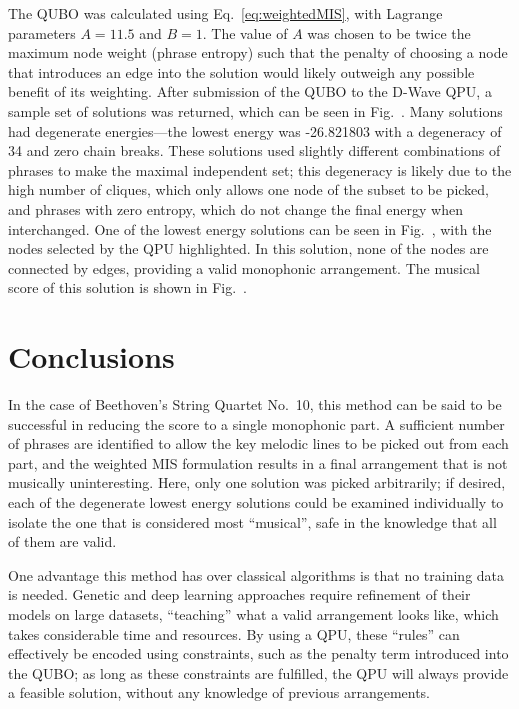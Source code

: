 \documentclass[12pt]{article}
\begin{document}
The QUBO was calculated using Eq.\ \ref{eq:weightedMIS}, with Lagrange parameters $A=11.5$ and $B=1$. The value of $A$ was chosen to be twice the maximum node weight (phrase entropy) such that the penalty of choosing a node that introduces an edge into the solution would likely outweigh any possible benefit of its weighting. After submission of the QUBO to the D-Wave QPU, a sample set of solutions was returned, which can be seen in Fig.\  . Many solutions had degenerate energies—the lowest energy was -26.821803 with a degeneracy of 34 and zero chain breaks. These solutions used slightly different combinations of phrases to make the maximal independent set; this degeneracy is likely due to the high number of cliques, which only allows one node of the subset to be picked, and phrases with zero entropy, which do not change the final energy when interchanged. One of the lowest energy solutions can be seen in Fig.\  , with the nodes selected by the QPU highlighted. In this solution, none of the nodes are connected by edges, providing a valid monophonic arrangement. The musical score of this solution is shown in Fig.\  .

\section{Conclusions}

In the case of Beethoven's String Quartet No.\ 10, this method can be said to be successful in reducing the score to a single monophonic part. A sufficient number of phrases are identified to allow the key melodic lines to be picked out from each part, and the weighted MIS formulation results in a final arrangement that is not musically uninteresting. Here, only one solution was picked arbitrarily; if desired, each of the degenerate lowest energy solutions could be examined individually to isolate the one that is considered most ``musical'', safe in the knowledge that all of them are valid.

One advantage this method has over classical algorithms is that no training data is needed. Genetic and deep learning approaches require refinement of their models on large datasets, ``teaching'' what a valid arrangement looks like, which takes considerable time and resources. By using a QPU, these ``rules'' can effectively be encoded using constraints, such as the penalty term introduced into the QUBO; as long as these constraints are fulfilled, the QPU will always provide a feasible solution, without any knowledge of previous arrangements.
\end{document}
